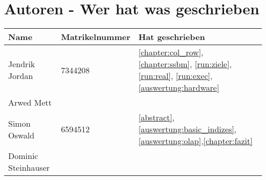 \chapter{Autoren - Wer hat was geschrieben}
\begin{table}[H]
    \centering
    \begin{tabularx}{\textwidth}{llX}
    \toprule
	Name                &	Matrikelnummer  & Hat geschrieben \\
    \toprule
    Jendrik Jordan      &   7344208         & \autoref{chapter:col_row}, \autoref{chapter:ssbm}, \autoref{run:ziele}, \autoref{run:real}, \autoref{run:exec}, \autoref{auswertung:hardware} \\
    Arwed Mett          &                   & \\
    Simon Oswald        &   6594512         & \autoref{abstract},\autoref{auswertung:basic_indizes},\autoref{auswertung:olap},\autoref{chapter:fazit} \\
    Dominic Steinhauser &                   & \\
    \bottomrule
    \end{tabularx}
    \label{tab:autoren}
\end{table}